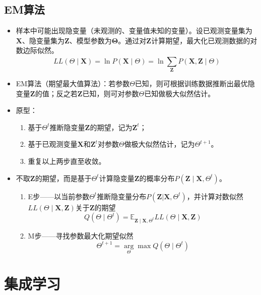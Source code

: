 \documentclass{ctexart}
\begin{document}
				\subsection{EM算法}
					\begin{itemize}
						\item 样本中可能出现隐变量（未观测的、变量值未知的变量）。设已观测变量集为$\bm{X}$、隐变量集为$\bm{Z}$、模型参数为$\bm{\Theta}$。通过对$\bm{Z}$计算期望，最大化已观测数据的对数边际似然。\[LL(\Theta\mid\bm{X})=\ln P(\bm{X}\mid\Theta)=\ln\sum_{\bm{Z}}^{}P(\bm{X},\bm{Z}\mid\Theta)\]
						\item EM算法（期望最大值算法）：若参数$\Theta$已知，则可根据训练数据推断出最优隐变量$\bm{Z}$的值；反之若$\bm{Z}$已知，则可对参数$\Theta$已知做极大似然估计。
						\item 原型：\begin{enumerate}
							\item 基于$\Theta^t$推断隐变量$\bm{Z}$的期望，记为$\bm{Z}^t$；
							\item 基于已观测变量$\bm{X}$和$\bm{Z}^t$对参数$\Theta$做极大似然估计，记为$\Theta^{t+1}$。
							\item 重复以上两步直至收敛。
						\end{enumerate}
						\item 不取$\bm{Z}$的期望，而是基于$\Theta^t$计算隐变量$\bm{Z}$的概率分布$P(\bm{Z}\mid \bm{X},\Theta^t)$。\begin{enumerate}
							\item E步——以当前参数$\Theta^t$推断隐变量分布$P(\bm{Z}|\bm{X},\Theta^t)$，并计算对数似然$LL(\Theta\mid\bm{X},\bm{Z})$关于$\bm{Z}$的期望\[Q(\Theta\mid\Theta^t)=\mathbb{E}_{\bm{Z}\mid \bm{X},\Theta^t}LL(\Theta\mid\bm{X},\bm{Z})\]
							\item M步——寻找参数最大化期望似然\[\Theta^{t+1}=\arg\limits_{\Theta}\max Q(\Theta\mid\Theta^t)\]
						\end{enumerate}
					\end{itemize}
			\section{集成学习}
\end{document}
